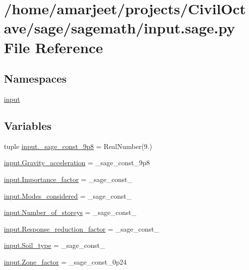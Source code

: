 \hypertarget{a00025}{}\section{/home/amarjeet/projects/\+Civil\+Octave/sage/sagemath/input.sage.\+py File Reference}
\label{a00025}
\subsection*{Namespaces}
\begin{DoxyCompactItemize}
\item 
 \hyperlink{a00038}{input}
\end{DoxyCompactItemize}
\subsection*{Variables}
\begin{DoxyCompactItemize}
\item 
tuple \hyperlink{a00038_ac1b86705df1981fd4962cc056fb0608a}{input.\+\_\+sage\+\_\+const\+\_\+9p8} = Real\+Number(\textquotesingle{}9.\textquotesingle{})
\item 
\hyperlink{a00038_a55ab15c1c171513e99332aa50c723764}{input.\+Gravity\+\_\+acceleration} = \+\_\+sage\+\_\+const\+\_\+9p8
\item 
\hyperlink{a00038_a0840d963ea24db338f3ab4457defb494}{input.\+Importance\+\_\+factor} = \+\_\+sage\+\_\+const\+\_
\item 
\hyperlink{a00038_adb7aca4735796aaa4a46456d3edeac2e}{input.\+Modes\+\_\+considered} = \+\_\+sage\+\_\+const\+\_
\item 
\hyperlink{a00038_a10237b312ba44e8c8090db86059c5803}{input.\+Number\+\_\+of\+\_\+storeys} = \+\_\+sage\+\_\+const\+\_
\item 
\hyperlink{a00038_aa6d0078a6d934c0d515d85059525e938}{input.\+Response\+\_\+reduction\+\_\+factor} = \+\_\+sage\+\_\+const\+\_
\item 
\hyperlink{a00038_a6221ae01cf2fb9e8cd22204749785a0e}{input.\+Soil\+\_\+type} = \+\_\+sage\+\_\+const\+\_
\item 
\hyperlink{a00038_aeea70e58ec9bb0d3d6c4363867eb0f82}{input.\+Zone\+\_\+factor} = \+\_\+sage\+\_\+const\+\_\+0p24
\end{DoxyCompactItemize}
